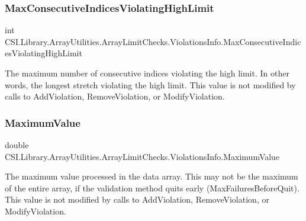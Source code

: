 \subsubsection{\texorpdfstring{MaxConsecutiveIndicesViolatingHighLimit}{MaxConsecutiveIndicesViolatingHighLimit}}
{\footnotesize\ttfamily int C\+S\+I.\+Library.\+Array\+Utilities.\+Array\+Limit\+Checks.\+Violations\+Info.\+Max\+Consecutive\+Indices\+Violating\+High\+Limit}



The maximum number of consecutive indices violating the high limit. In other words, the longest stretch violating the high limit. This value is not modified by calls to Add\+Violation, Remove\+Violation, or Modify\+Violation. 

\mbox{\label{struct_c_s_i_1_1_library_1_1_array_utilities_1_1_array_limit_checks_1_1_violations_info_a4aab054ecd40dc59dbd5e06950366349}} 
\subsubsection{\texorpdfstring{MaximumValue}{MaximumValue}}
{\footnotesize\ttfamily double C\+S\+I.\+Library.\+Array\+Utilities.\+Array\+Limit\+Checks.\+Violations\+Info.\+Maximum\+Value}



The maximum value processed in the data array. This may not be the maximum of the entire array, if the validation method quits early (Max\+Failures\+Before\+Quit). This value is not modified by calls to Add\+Violation, Remove\+Violation, or Modify\+Violation. 

\mbox{\label{struct_c_s_i_1_1_library_1_1_array_utilities_1_1_array_limit_checks_1_1_violations_info_a55b918a4ed299b545693f52f8345a6d3}} 
